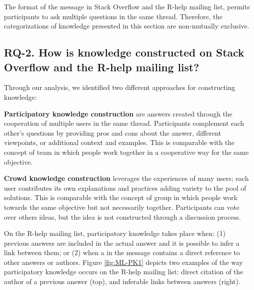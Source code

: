 \documentclass{sig-alternate-05-2015}
\begin{document}
	The format of the message in Stack Overflow and the R-help mailing list, permits participants to ask multiple questions in the same thread.
	Therefore, the categorizations of knowledge presented in this section are non-mutually exclusive.

\subsection{RQ-2. How is knowledge constructed on Stack Overflow and the R-help mailing list?}
\label{sec:rq2}


	Through our analysis, we identified two different approaches for constructing knowledge:
	\begin{packed_enum}
		\item \textbf{Participatory knowledge construction} are answers created through the cooperation of multiple users in the same thread.
		Participants complement each other's questions by providing pros and cons about the answer, different viewpoints, or additional context and examples.
		This is comparable with the concept of team in which people work together in a cooperative way for the same objective.

		\item \textbf{Crowd knowledge construction} leverages the experiences of many users; each user contributes its own explanations and practices adding variety to the pool of solutions.
		This is comparable with the concept of group in which people work towards the same objective but not necessarily together.
		Participants can vote over others ideas, but the idea is not constructed through a discussion process.
	\end{packed_enum}

	On the R-help mailing list, participatory knowledge takes place when:
	(1) previous answers are included in the actual answer and it is possible to infer a link between them; or
	(2) when a in the message contains a direct reference to other answers or authors.
	Figure \ref{fig:ML-PK1} depicts two examples of the way participatory knowledge occurs on the R-help mailing list:
	direct citation of the author of a previous answer (top), and inferable links between answers (right).
\end{document}
